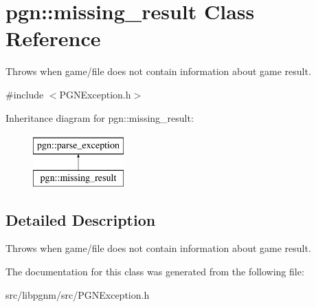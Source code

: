 \hypertarget{classpgn_1_1missing__result}{
\section{pgn::missing\_\-result Class Reference}
\label{classpgn_1_1missing__result}
}


Throws when game/file does not contain information about game result.  




{\ttfamily \#include $<$PGNException.h$>$}

Inheritance diagram for pgn::missing\_\-result:\begin{figure}[H]
\begin{center}
\leavevmode
\includegraphics[height=2.000000cm]{classpgn_1_1missing__result}
\end{center}
\end{figure}


\subsection{Detailed Description}
Throws when game/file does not contain information about game result. 

The documentation for this class was generated from the following file:\begin{DoxyCompactItemize}
\item 
src/libpgnm/src/PGNException.h\end{DoxyCompactItemize}
